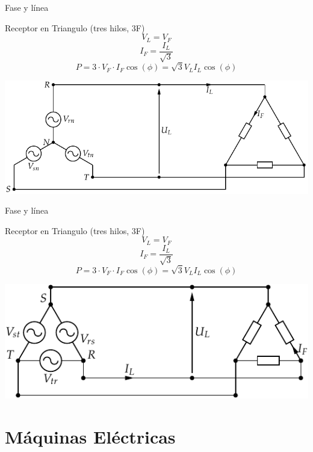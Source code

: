 \documentclass[xcolor={usenames,svgnames,dvipsnames}]{beamer}
\begin{document}
\begin{frame}[label={sec:orgb4d10ff}]{Fase y línea}
\begin{block}{Receptor en Triangulo (tres hilos, 3F)}
$$V_{L}=V_{F}$$ $$I_{F}=\frac{I_{L}}{\sqrt{3}}$$
$$P=3\cdot V_{F}\cdot I_{F}\cos(\phi)=\sqrt{3}V_{L}I_{L}\cos(\phi)$$
\begin{center}
\includegraphics[width=.9\linewidth]{../figs/RedTrifasicaEstrella_CargaTriangulo.pdf}
\end{center}
\end{block}
\end{frame}

\begin{frame}[label={sec:org947853d}]{Fase y línea}
\begin{block}{Receptor en Triangulo (tres hilos, 3F)}
$$V_{L}=V_{F}$$ $$I_{F}=\frac{I_{L}}{\sqrt{3}}$$
$$P=3\cdot V_{F}\cdot I_{F}\cos(\phi)=\sqrt{3}V_{L}I_{L}\cos(\phi)$$
\begin{center}
\includegraphics[width=.9\linewidth]{../figs/RedTrifasicaTriangulo.pdf}
\end{center}
\end{block}
\end{frame}

\section{Máquinas Eléctricas}
\label{sec:org766fdd5}
\end{document}

